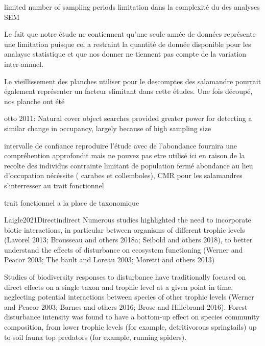   limited number of sampling periods
  limitation dans la complexité du des analyses SEM

Le fait que notre étude ne contiennent qu'une seule année de données représente une limitation puisque cel a restraint la quantité de donnée disponible pour les analayse statistique  et que 
nos donner ne tiennent pas compte de la variation inter-annuel. 

Le vieillissement des planches utiliser pour le descomptes des salamandre pourrait également représenter un facteur slimitant dans cette études. Une fois découpé, nos planche ont été 

  otto 2011:
  Natural cover object searches provided greater power for detecting a similar change in occupancy, largely because of high sampling size

    intervalle de confiance
  reproduire l'étude avec de l'abondance fournira une compréhention approfondit mais ne pouvez pas etre utilisé ici en raison de la recolte des individus
  contrainte limitant de population fermé
  abondance au lieu d'occupation nécéssite ( carabes et collemboles), CMR pour les salamandres
  s'interresser au trait fonctionnel 

  trait fonctionnel a la place de taxonomique



Laigle2021Directindirect
Numerous studies highlighted the need to incorporate biotic interactions, in particular between organisms of different trophic levels (Lavorel 2013; Brousseau and others 2018a; Seibold and others 2018), to better understand the effects of disturbance on ecosystem functioning (Werner and Peacor 2003; The bault and Loreau 2003; Moretti and others 2013)

Studies of biodiversity responses to disturbance have traditionally focused on direct effects on a single taxon and trophic level at a given point in time, neglecting potential interactions between species of other trophic levels (Werner and Peacor 2003; Barnes and others 2016; Brose and Hillebrand 2016).
Forest disturbance intensity was found to have a bottom-up effect on species community composition, from lower trophic levels (for example, detritivorous springtails) up to soil fauna top predators (for example, running spiders).


